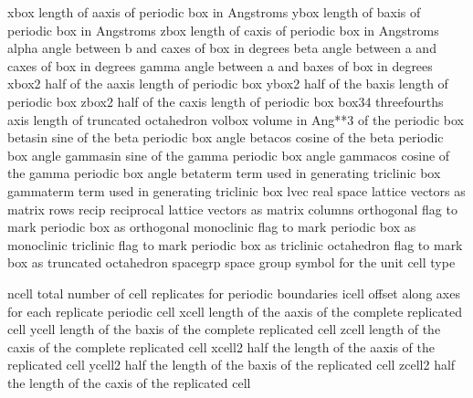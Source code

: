\documentclass[letterpaper,11pt,english]{sphinxmanual}
\begin{document}
\begin{sphinxVerbatim}[commandchars=\\\{\}]
xbox            length of a\PYGZhy{}axis of periodic box in Angstroms
ybox            length of b\PYGZhy{}axis of periodic box in Angstroms
zbox            length of c\PYGZhy{}axis of periodic box in Angstroms
alpha           angle between b\PYGZhy{} and c\PYGZhy{}axes of box in degrees
beta            angle between a\PYGZhy{} and c\PYGZhy{}axes of box in degrees
gamma           angle between a\PYGZhy{} and b\PYGZhy{}axes of box in degrees
xbox2           half of the a\PYGZhy{}axis length of periodic box
ybox2           half of the b\PYGZhy{}axis length of periodic box
zbox2           half of the c\PYGZhy{}axis length of periodic box
box34           three\PYGZhy{}fourths axis length of truncated octahedron
volbox          volume in Ang**3 of the periodic box
beta\PYGZus{}sin        sine of the beta periodic box angle
beta\PYGZus{}cos        cosine of the beta periodic box angle
gamma\PYGZus{}sin       sine of the gamma periodic box angle
gamma\PYGZus{}cos       cosine of the gamma periodic box angle
beta\PYGZus{}term       term used in generating triclinic box
gamma\PYGZus{}term      term used in generating triclinic box
lvec            real space lattice vectors as matrix rows
recip           reciprocal lattice vectors as matrix columns
orthogonal      flag to mark periodic box as orthogonal
monoclinic      flag to mark periodic box as monoclinic
triclinic       flag to mark periodic box as triclinic
octahedron      flag to mark box as truncated octahedron
spacegrp        space group symbol for the unit cell type
\end{sphinxVerbatim}


\begin{sphinxVerbatim}[commandchars=\\\{\}]
ncell           total number of cell replicates for periodic boundaries
icell           offset along axes for each replicate periodic cell
xcell           length of the a\PYGZhy{}axis of the complete replicated cell
ycell           length of the b\PYGZhy{}axis of the complete replicated cell
zcell           length of the c\PYGZhy{}axis of the complete replicated cell
xcell2          half the length of the a\PYGZhy{}axis of the replicated cell
ycell2          half the length of the b\PYGZhy{}axis of the replicated cell
zcell2          half the length of the c\PYGZhy{}axis of the replicated cell
\end{sphinxVerbatim}
\end{document}
